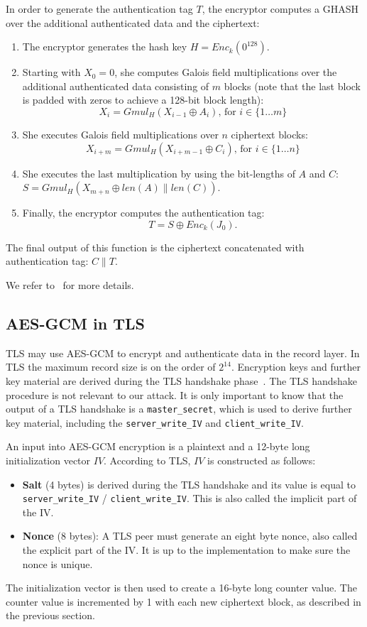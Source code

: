 \documentclass[10pt, a4paper]{article}
\begin{document}
In order to generate the authentication tag $T$, the encryptor computes a GHASH over the additional authenticated data and the ciphertext:
\begin{enumerate}
	\item The encryptor generates the hash key $H = Enc_k(0^{128})$.
	\item Starting with $X_0 = 0$, she computes Galois field multiplications over the additional authenticated data consisting of $m$ blocks (note that the last block is padded with zeros to achieve a 128-bit block length):
	\[
	X_i = Gmul_H (X_{i-1} \oplus A_i) \text{, for } i \in \{1 \ldots m\}
	\]
	\item She executes Galois field multiplications over $n$ ciphertext blocks:
	\[
	X_{i+m} = Gmul_H (X_{i+m-1} \oplus C_i) \text{, for } i \in \{1 \ldots n\}
	\]
	\item She executes the last multiplication by using the bit-lengths of $A$ and $C$: $S = Gmul_H(X_{m+n} \oplus len(A) \parallel len(C))$.
	\item Finally, the encryptor computes the authentication tag:
	\[
	T = S \oplus Enc_k(J_0).
	\]
\end{enumerate}

The final output of this function is the ciphertext concatenated with authentication tag: $C \parallel T$.

We refer to~\cite{gcm-nist} for more details.


\subsection{AES-GCM in TLS}
TLS may use AES-GCM to encrypt and authenticate data in the record layer. In TLS the maximum record size is on the order of $2^{14}$. Encryption keys and further key material are derived during the TLS handshake phase~\cite{rfc5246}.
The TLS handshake procedure is not relevant to our attack. It is only important to know that the output of a TLS handshake is a \texttt{master\_secret},
which is used to derive further key material, including the \texttt{server\_write\_IV} and \texttt{client\_write\_IV}.

An input into AES-GCM encryption is a plaintext and a 12-byte long initialization vector $IV$. According to TLS, $IV$ is constructed as follows:
\begin{itemize}
	\item  \textbf{Salt} (4 bytes) is derived during the TLS handshake and its value is equal to  \texttt{server\_write\_IV} / \texttt{client\_write\_IV}. This is also called the implicit part of the IV.
	\item \textbf{Nonce} (8 bytes): A TLS peer must generate an eight byte nonce, also called the explicit part of the IV. It is up to the implementation to make sure the nonce is unique.
\end{itemize}
The initialization vector is then used to create a 16-byte long counter value. The counter value is incremented by 1 with each new ciphertext block, as described in the previous section.
\end{document}
